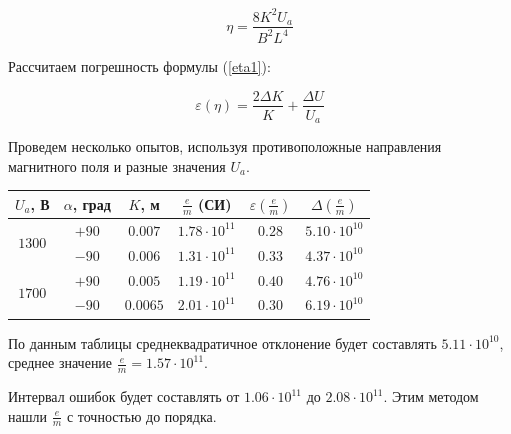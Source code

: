 \begin{equation}
	\eta=\frac{8K^2U_a}{B^2L^4}	
	\label{eta1}
\end{equation}

Рассчитаем погрешность формулы (\ref{eta1}):

\begin{equation}
	\varepsilon{(\eta)}=\frac{2\Delta{K}}{K}+\frac{\Delta{U}}{U_a}
\end{equation}

Проведем несколько опытов, используя противоположные направления магнитного поля и разные значения $U_a$.


\begin{table}[h]
\begin{center}
\begin{tabular}{|c|c|c|c|c|c|}

\hline
$U_a$, В & $\alpha$, град & $K$, м & $\frac{e}{m}$ (СИ) & $\varepsilon{(\frac{e}{m})}$ & $\Delta{(\frac{e}{m})}$\\
\hline
\multirow{2}{*}{$1300$} & $+90$ & $0.007$ & $1.78\cdot10^{11}$ & $0.28$ & $5.10\cdot10^{10}$ \\ 

\cline{2-6}
						& $-90$ & $0.006$ & $1.31\cdot10^{11}$ & $0.33$ & $4.37\cdot10^{10}$ \\ \hline
\multirow{2}{*}{$1700$} & $+90$ & $0.005$ & $1.19\cdot10^{11}$ & $0.40$ & $4.76\cdot10^{10}$ \\
\cline{2-6}
						& $-90$ &$0.0065$ & $2.01\cdot10^{11}$ & $0.30$ & $6.19\cdot10^{10}$ \\ \hline

\end{tabular}
\end{center}
\end{table} 

По данным таблицы среднеквадратичное отклонение будет составлять $5.11\cdot10^{10}$, среднее значение $\frac{e}{m}=1.57\cdot10^{11}$.

Интервал ошибок будет составлять от $1.06\cdot10^{11}$ до $2.08\cdot10^{11}$. Этим методом нашли $\frac{e}{m}$ с точностью до порядка.

